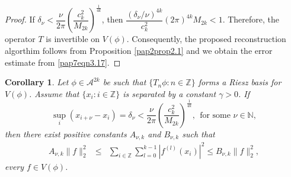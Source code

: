 \documentclass[a4paper,12pt,reqno]{amsart}
\theoremstyle{plain}
\numberwithin{equation}{section}
\newtheorem{cor}{Corollary}[section]
\theoremstyle{definition}
\newcommand{\ds}{\displaystyle}
\begin{document}
\begin{proof}
If $\delta_\nu<\dfrac{\nu}{2\pi}\left(\dfrac{c_{k}^2}{M_{2k}}\right)^{\frac{1}{4k}}$, then $\dfrac{\left(\delta_\nu/\nu\right)^{4k}}{c_{k}^2}(2\pi)^{4k}M_{2k}<1$. Therefore, the operator $T$ is invertible on $V(\phi)$.
Consequently, the proposed reconstruction algorthim follows from Proposition \ref{pap2prop2.1} and  we obtain the error estimate from \eqref{pap7eqn3.17}.
\end{proof}
\begin{cor}\label{pap7cor3.1}
Let $\phi\in\mathcal{A}^{2k}$ be such that $\{T_{n}\phi:n\in\mathbb{Z}\}$ forms a Riesz basis for $V(\phi)$. Assume that $\{x_i:{i\in\mathbb{Z}}\}$ is separated by a constant $\gamma>0$.
If 
$$\sup\limits_i(x_{i+\nu}-x_i)=\delta_\nu<\dfrac{\nu}{2\pi}\left(\dfrac{c_{k}^2}{M_{2k}}\right)^{\frac{1}{4k}},~~\text{for some~}\nu\in\mathbb{N,}$$ 
then there exist positive constants 
$A_{\nu,k}$  and $B_{\nu,k}$ such that
\begin{eqnarray}\label{pap3eqn2.7}
A_{\nu,k}\| f\|_2^2&\leq&\ds\sum\limits_{i\in\mathbb{Z}}
\ds\sum\limits_{l=0}^{k-1}|f^{(l)}(x_i)|^2\leq B_{\nu,k}\| f\|_2^2,
\end{eqnarray}
every $f\in V(\phi)$.
\end{cor}
\end{document}
